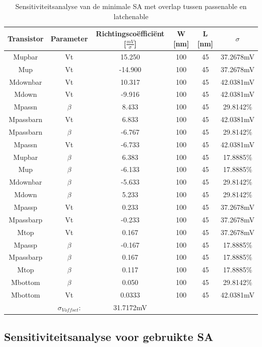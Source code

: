 \begin{table}
\begin{tabular}{cccccc}
\hline 
Transistor & Parameter & Richtingscoëfficiënt [$\frac{mV}{\sigma}$] & W [nm] & L [nm] & $\sigma$ \\ 
\hline 
Mupbar & Vt & 15.250 & 100 & 45 & 37.2678mV \\ 
Mup & Vt & -14.900 & 100 & 45 & 37.2678mV \\ 
Mdownbar & Vt & 10.317 & 100 & 45 & 42.0381mV \\ 
Mdown & Vt & -9.916 & 100 & 45 & 42.0381mV \\
Mpassn & $\beta$ & 8.433 & 100 & 45 & 29.8142\% \\ 
Mpassbarn & Vt & 6.833 & 100 & 45 & 42.0381mV \\
Mpassbarn & $\beta$ & -6.767 & 100 & 45 & 29.8142\% \\
Mpassn & Vt & -6.733 & 100 & 45 & 42.0381mV \\ 
Mupbar & $\beta$ & 6.383 & 100 & 45 & 17.8885\% \\ 
Mup & $\beta$ & -6.133 & 100 & 45 & 17.8885\% \\ 
Mdownbar & $\beta$ & -5.633 & 100 & 45 & 29.8142\% \\  
Mdown & $\beta$ & 5.233 & 100 & 45 & 29.8142\% \\ 
Mpassp & Vt & 0.233 & 100 & 45 & 37.2678mV \\
Mpassbarp & Vt & -0.233 & 100 & 45 & 37.2678mV \\
Mtop & Vt & 0.167 & 100 & 45 & 37.2678mV \\  
Mpassp & $\beta$ & -0.167 & 100 & 45 & 17.8885\% \\ 
Mpassbarp & $\beta$ & 0.167 & 100 & 45 & 17.8885\% \\ 
Mtop & $\beta$ & 0.117 & 100 & 45 & 17.8885\% \\
Mbottom & $\beta$ & 0.050 & 100 & 45 & 29.8142\% \\ 
Mbottom & Vt & 0.0333 & 100 & 45 & 42.0381mV \\ 
\hline 
\hline & $\sigma_{Voffset}$: & 31.7172mV & & & \\
\hline
\end{tabular} 
\caption{Sensitiviteitsanalyse van de minimale SA met overlap tussen passenable en latchenable}
\label{tab:min-sensanalysis-overlap}
\end{table}

\subsection{Sensitiviteitsanalyse voor gebruikte SA}

